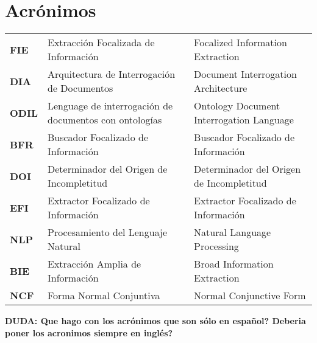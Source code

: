 \chapter*{Acrónimos}

\newcommand{\TERM}[3]{
	\textbf{#1} & #3 & #2 \\[5pt]
}

\begin{longtable}{p{1in}p{2.2in}p{3in}}

		\TERM{FIE}{Focalized Information Extraction}{Extracción Focalizada de Información}
		\TERM{DIA}{Document Interrogation Architecture}{Arquitectura de Interrogación de Documentos}
		\TERM{ODIL}{Ontology Document Interrogation Language}{Lenguage de interrogación de documentos con ontologías}		
		\TERM{BFR}{Buscador Focalizado de Información}{Buscador Focalizado de Información}
		\TERM{DOI}{Determinador del Origen de Incompletitud}{Determinador del Origen de Incompletitud}		
		\TERM{EFI}{Extractor Focalizado de Información}{Extractor Focalizado de Información}
		\TERM{NLP}{Natural Language Processing}{Procesamiento del Lenguaje Natural}				
		\TERM{BIE}{Broad Information Extraction}{Extracción Amplia de Información}				
		\TERM{NCF}{Normal Conjunctive Form}{Forma Normal Conjuntiva}		

\end{longtable}

		\textbf{DUDA: Que hago con los acrónimos que son sólo en español? Deberia poner los acronimos siempre en inglés?}
		
\newpage
